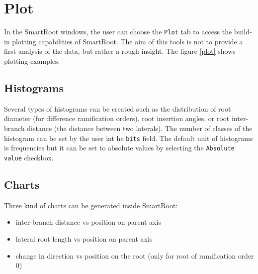 \documentclass[a4paper,english,10pt]{report}
\begin{document}

\newpage
{\color{coolSection}\section{Plot}}
\label{chapplot}

In the SmartRoot windows, the user can choose the \verb|Plot| tab to access the build-in plotting capabilities of SmartRoot. The aim of this tools is not to provide a first analysis of the data, but rather a rough insight. The figure \ref{plot} shows plotting examples.\\


\subsection{Histograms\\}
\label{hist}

Several types of histograms can be created such as the distribution of root diameter (for difference ramification orders), root insertion angles, or root inter-branch distance (the distance between two laterals). The number of classes of the histogram can be set by the user int he \verb|bits| field. The default unit of histograms is frequencies but it can be set to absolute values by selecting the \verb|Absolute value| checkbox.

\subsection{Charts\\}
\label{chart}

Three kind of charts can be generated inside SmartRoot: 

\begin{itemize}
\item inter-branch distance vs position on parent axis
\item lateral root length vs position on parent axis
\item change in direction vs position on the root (only for root of ramification order 0)
\end{itemize}
\end{document}

